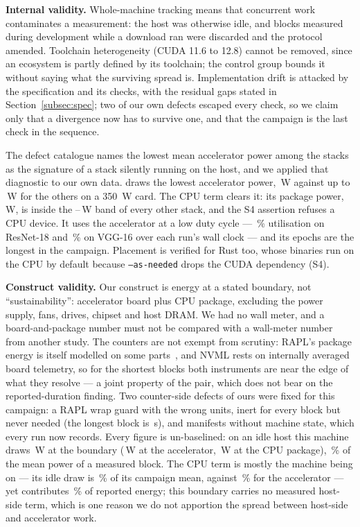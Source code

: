 \textbf{Internal validity.} Whole-machine tracking means that concurrent work
contaminates a measurement: the host was otherwise idle, and blocks measured
during development while a download ran were discarded and the protocol
amended. Toolchain heterogeneity (CUDA 11.6 to 12.8) cannot be removed, since
an ecosystem is partly defined by its toolchain; the control group bounds it
without saying what the surviving spread is. Implementation drift is attacked by
the specification and its checks, with the residual gaps stated in
Section~\ref{subsec:spec}; two of our own defects escaped every check, so we
claim only that a divergence now has to survive one, and that the campaign is
the last check in the sequence.

The defect catalogue names the lowest mean accelerator power among the stacks
as the signature of a stack silently running on the host, and we applied that
diagnostic to our own data. \vLowestGpuEco{} draws the lowest accelerator power, \vLowestGpuW\,\si{\watt} against up to
\vHighestGpuW\,\si{\watt} for the others on a \SI{350}{\watt} card. The CPU
term clears it: its
package power, \vLowestGpuEcoCpuW\,\si{\watt}, is inside the
\vCpuPowerAcrossMinW--\vCpuPowerAcrossMaxW\,\si{\watt} band of every other stack,
and the S4 assertion refuses a CPU device. It uses the accelerator at a low duty
cycle --- \vLowestGpuUtilResnetPct\,\% utilisation on ResNet-18 and
\vLowestGpuUtilVggPct\,\% on VGG-16 over each run's wall clock --- and its epochs
are the longest in the campaign. Placement is verified for Rust too, whose
binaries run on the CPU by default because \texttt{--as-needed} drops the CUDA
dependency (S4).

\textbf{Construct validity.} Our construct is energy at a stated boundary, not
``sustainability'': accelerator board plus CPU package, excluding the power
supply, fans, drives, chipset and host DRAM. We had no wall meter, and a
board-and-package number must not be compared with a wall-meter number from
another study. The counters are not exempt from scrutiny: RAPL's package energy
is itself modelled on some parts~\citep{khan2018rapl}, and NVML rests on
internally averaged board telemetry, so for the shortest blocks both instruments
are near the edge of what they resolve --- a joint property of the pair, which
does not bear on the reported-duration finding. Two counter-side defects of ours
were fixed for this campaign: a RAPL wrap guard with the wrong units, inert for
every block but never needed (the longest block is
\vLongestBlockS\,\si{\second}), and manifests without machine state, which every
run now records. Every figure is un-baselined: on an idle host this machine
draws \vIdleTotalW\,\si{\watt} at the boundary (\vIdleGpuW\,\si{\watt} at the
accelerator, \vIdleCpuW\,\si{\watt} at the CPU package),
\vIdleShareOfBlockPct\,\% of the mean power of a measured block. The CPU term is
mostly the machine being on --- its idle draw is \vIdleCpuSharePct\,\% of its
campaign mean, against \vIdleGpuSharePct\,\% for the accelerator --- yet
contributes \vCpuShareOfTotalPct\,\% of reported energy; this boundary carries no
measured host-side term, which is one reason we do not apportion the spread
between host-side and accelerator work.

